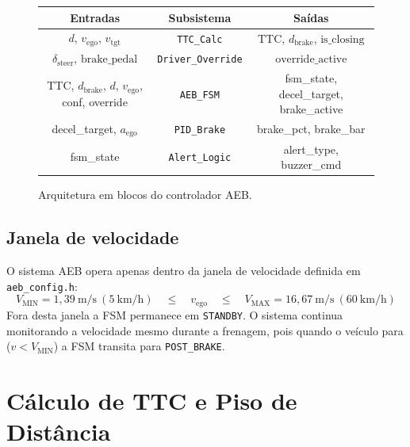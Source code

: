 \documentclass[12pt,a4paper]{article}
\begin{document}
\begin{figure}[H]
    \centering
    \begin{tabular}{|c|c|c|}
        \hline
        \textbf{Entradas} & \textbf{Subsistema} & \textbf{Saídas} \\
        \hline
        $d$, $v_{\text{ego}}$, $v_{\text{tgt}}$ & \texttt{TTC\_Calc} &
            $\text{TTC}$, $d_{\text{brake}}$, $\text{is\_closing}$ \\
        \hline
        $\delta_{\text{steer}}$, $\text{brake\_pedal}$ & \texttt{Driver\_Override} &
            $\text{override\_active}$ \\
        \hline
        TTC, $d_{\text{brake}}$, $d$, $v_{\text{ego}}$, conf, override &
            \texttt{AEB\_FSM} &
            fsm\_state, decel\_target, brake\_active \\
        \hline
        decel\_target, $a_{\text{ego}}$ & \texttt{PID\_Brake} &
            brake\_pct, brake\_bar \\
        \hline
        fsm\_state & \texttt{Alert\_Logic} &
            alert\_type, buzzer\_cmd \\
        \hline
    \end{tabular}
    \caption{Arquitetura em blocos do controlador AEB.}
    \label{fig:arquitetura_blocos}
\end{figure}

\subsection{Janela de velocidade}

O sistema AEB opera apenas dentro da janela de velocidade definida em
\texttt{aeb\_config.h}:
\[
    V_{\text{MIN}} = 1{,}39\ \text{m/s}\ (5\ \text{km/h})
    \quad \leq \quad v_{\text{ego}} \quad \leq \quad
    V_{\text{MAX}} = 16{,}67\ \text{m/s}\ (60\ \text{km/h})
\]
Fora desta janela a FSM permanece em \texttt{STANDBY}. O sistema continua
monitorando a velocidade mesmo durante a frenagem, pois quando o veículo
para (${v < V_{\text{MIN}}}$) a FSM transita para \texttt{POST\_BRAKE}.

\section{Cálculo de TTC e Piso de Distância}
\label{sec:ttc}
\end{document}

